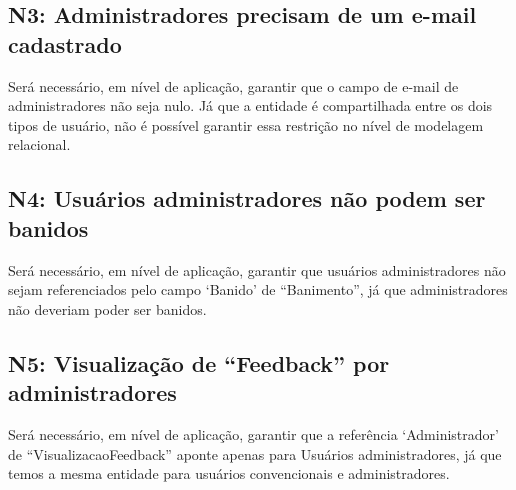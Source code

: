 \subsection{\textbf{N3:} Administradores precisam de um e-mail cadastrado}

Será necessário, em nível de aplicação, garantir que o campo de e-mail de
administradores não seja nulo. Já que a entidade é compartilhada entre os dois
tipos de usuário, não é possível garantir essa restrição no nível de modelagem
relacional.

\subsection{\textbf{N4:} Usuários administradores não podem ser banidos}

Será necessário, em nível de aplicação, garantir que usuários administradores
não sejam referenciados pelo campo `Banido' de ``Banimento'', já que
administradores não deveriam poder ser banidos.

\subsection{\textbf{N5:} Visualização de ``Feedback'' por administradores}

Será necessário, em nível de aplicação, garantir que a referência
`Administrador' de ``VisualizacaoFeedback'' aponte apenas para Usuários
administradores, já que temos a mesma entidade para usuários convencionais e
administradores.
